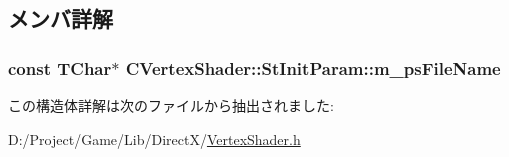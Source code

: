 \subsection{メンバ詳解}
\hypertarget{struct_c_vertex_shader_1_1_st_init_param_a67b84a216d788d1e84cb10a7e1f1c0a0}{}
\subsubsection[{m\+\_\+ps\+File\+Name}]{\setlength{\rightskip}{0pt plus 5cm}const T\+Char$\ast$ C\+Vertex\+Shader\+::\+St\+Init\+Param\+::m\+\_\+ps\+File\+Name}\label{struct_c_vertex_shader_1_1_st_init_param_a67b84a216d788d1e84cb10a7e1f1c0a0}


この構造体詳解は次のファイルから抽出されました\+:\begin{DoxyCompactItemize}
\item 
D\+:/\+Project/\+Game/\+Lib/\+Direct\+X/\hyperlink{_vertex_shader_8h}{Vertex\+Shader.\+h}\end{DoxyCompactItemize}
